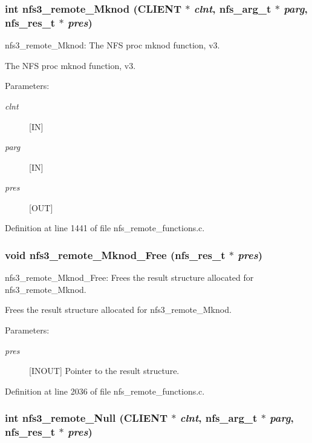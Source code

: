 \subsubsection{\setlength{\rightskip}{0pt plus 5cm}int nfs3\_\-remote\_\-Mknod (CLIENT $\ast$ {\em clnt}, nfs\_\-arg\_\-t $\ast$ {\em parg}, nfs\_\-res\_\-t $\ast$ {\em pres})}\label{group__NFSprocs_ga39}


nfs3\_\-remote\_\-Mknod: The NFS proc mknod function, v3.

The NFS proc mknod function, v3.

\begin{Desc}
\item[Parameters:]
\begin{description}
\item[{\em clnt}][IN] \item[{\em parg}][IN] \item[{\em pres}][OUT] \end{description}
\end{Desc}


Definition at line 1441 of file nfs\_\-remote\_\-functions.c.
\subsubsection{\setlength{\rightskip}{0pt plus 5cm}void nfs3\_\-remote\_\-Mknod\_\-Free (nfs\_\-res\_\-t $\ast$ {\em pres})}\label{group__NFSprocs_ga82}


nfs3\_\-remote\_\-Mknod\_\-Free: Frees the result structure allocated for nfs3\_\-remote\_\-Mknod.

Frees the result structure allocated for nfs3\_\-remote\_\-Mknod.

\begin{Desc}
\item[Parameters:]
\begin{description}
\item[{\em pres}][INOUT] Pointer to the result structure. \end{description}
\end{Desc}


Definition at line 2036 of file nfs\_\-remote\_\-functions.c.
\subsubsection{\setlength{\rightskip}{0pt plus 5cm}int nfs3\_\-remote\_\-Null (CLIENT $\ast$ {\em clnt}, nfs\_\-arg\_\-t $\ast$ {\em parg}, nfs\_\-res\_\-t $\ast$ {\em pres})}\label{group__NFSprocs_ga18}


